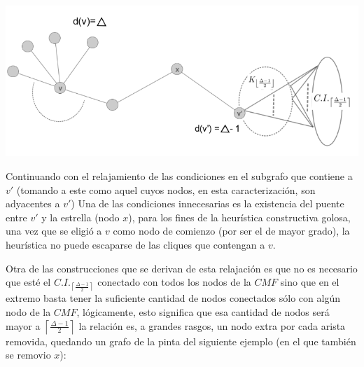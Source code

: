 \begin{center} 
	\includegraphics[scale = 0.6]{img/ej3/constructiva_golosa/vnotincmf_carac2.png} 
\end{center}

Continuando con el relajamiento de las condiciones en el subgrafo que contiene a $v'$
(tomando a este como aquel cuyos nodos, en esta caracterizaci\'on, son adyacentes a $v'$)
Una de las condiciones innecesarias es la existencia del puente entre $v'$ y la estrella 
(nodo $x$), para los fines de la heur\'istica constructiva golosa, una vez que se eligi\'o
a $v$ como nodo de comienzo (por ser el de mayor grado), la heur\'istica no puede escaparse
de las cliques que contengan a $v$. 

Otra de las construcciones que se derivan de esta relajaci\'on es que no es necesario
que est\'e el $C.I._{\left\lceil \frac{\Delta -1}{2} \right\rceil}$ conectado con 
todos los nodos de la $CMF$ sino que en el extremo basta tener la suficiente cantidad
de nodos conectados s\'olo con alg\'un nodo de la $CMF$, l\'ogicamente, esto significa
que esa cantidad de nodos ser\'a mayor a $\left\lceil \frac{\Delta -1}{2} \right\rceil$ 
la relaci\'on es, a grandes rasgos, un nodo extra por cada arista removida, quedando 
un grafo de la pinta del siguiente ejemplo (en el que tambi\'en se removio $x$):

